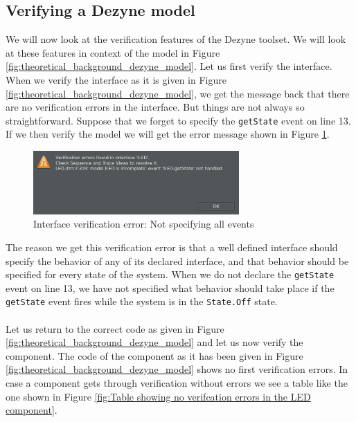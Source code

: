 \documentclass[12pt]{scrreprt}
\begin{document}
\subsection{Verifying a Dezyne model}
\label{Verifying a Dezyne model}
We will now look at the verification features of the Dezyne toolset. We will look at these features in context of the model in Figure \ref{fig:theoretical_background_dezyne_model}. Let us first verify the interface. When we verify the interface as it is given in Figure \ref{fig:theoretical_background_dezyne_model}, we get the message back that there are no verification errors in the interface. But things are not always so straightforward. Suppose that we forget to specify the \texttt{getState} event on line 13. If we then verify the model we will get the error message shown in Figure \ref{fig:not_specifying_all_events_error}.

\begin{figure}[H]
    \centering
    \includegraphics[width=0.7\textwidth]{Figures/theoretical_background/verification_of_interface_error.png}
    \caption{Interface verification error: Not specifying all events}
    \label{fig:not_specifying_all_events_error}
\end{figure}

The reason we get this verification error is that a well defined interface should specify the behavior of any of its declared interface, and that behavior should be specified for every state of the system. When we do not declare the \texttt{getState} event on line 13, we have not specified what behavior should take place if the \texttt{getState} event fires while the system is in the \texttt{State.Off} state.
\\\\
Let us return to the correct code as given in Figure \ref{fig:theoretical_background_dezyne_model} and let us now verify the component. The code of the component as it has been given in Figure \ref{fig:theoretical_background_dezyne_model} shows no first verification errors. In case a component gets through verification without errors we see a table like the one shown in Figure \ref{fig:Table showing no verifcation errors in the LED component}.
\end{document}
